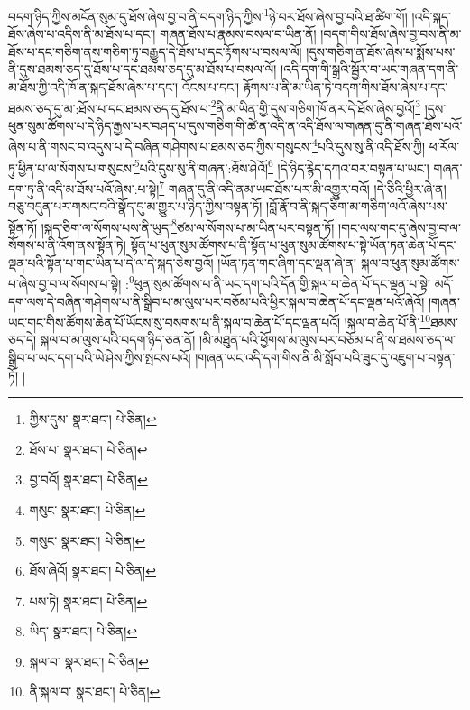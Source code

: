 བདག་ཉིད་ཀྱིས་མངོན་སུམ་དུ་ཐོས་ཞེས་བྱ་བ་ནི་བདག་ཉིད་ཀྱིས་\footnote{ཀྱིས་དུས་  སྣར་ཐང་།  པེ་ཅིན། }ཉེ་བར་ཐོས་ཞེས་བྱ་བའི་ཐ་ཚིག་གོ། །འདི་སྐད་ཐོས་ཞེས་པ་འདིས་ནི་མ་ཐོས་པ་དང་། གཞན་ཐོས་པ་རྣམས་བསལ་བ་ཡིན་ནོ། །བདག་གིས་ཐོས་ཞེས་བྱ་བས་ནི་མ་ཐོས་པ་དང་གཅིག་ནས་གཅིག་ཏུ་བརྒྱུད་དེ་ཐོས་པ་དང་རྟོགས་པ་བསལ་ལོ། །དུས་གཅིག་ན་ཐོས་ཞེས་པ་སྨོས་པས་ནི་དུས་ཐམས་ཅད་དུ་ཐོས་པ་དང་ཐམས་ཅད་དུ་མ་ཐོས་པ་བསལ་ལོ། །འདི་དག་གི་སྒྲའི་སྦྱོར་བ་ཡང་གཞན་དག་ནི་མ་ཐོས་ཀྱི་འདི་ཁོ་ན་སྐད་ཐོས་ཞེས་པ་དང་། འོངས་པ་དང་། རྟོགས་པ་ནི་མ་ཡིན་ཏེ་བདག་གིས་ཐོས་ཞེས་པ་དང་ཐམས་ཅད་དུ་མ་:ཐོས་པ་དང་ཐམས་ཅད་དུ་ཐོས་པ་\footnote{ཐོས་པ་  སྣར་ཐང་།  པེ་ཅིན། }ནི་མ་ཡིན་གྱི་དུས་གཅིག་ཁོ་ནར་དེ་ཐོས་ཞེས་བྱའོ།\footnote{བྱ་བའོ།  སྣར་ཐང་།  པེ་ཅིན། } །དུས་ཕུན་སུམ་ཚོགས་པ་དེ་ཉིད་རྒྱས་པར་བཤད་པ་དུས་གཅིག་གི་ཚེ་ན་འདི་ན་འདི་ཐོས་ལ་གཞན་དུ་ནི་གཞན་ཐོས་པའོ་ཞེས་པ་ནི་གསང་བ་འདུས་པ་དེ་བཞིན་གཤེགས་པ་ཐམས་ཅད་ཀྱིས་གསུངས་\footnote{གསུང་  སྣར་ཐང་།  པེ་ཅིན། }པའི་དུས་སུ་ནི་འདི་ཐོས་ཀྱི། ཕ་རོལ་ཏུ་ཕྱིན་པ་ལ་སོགས་པ་གསུངས་\footnote{གསུང་  སྣར་ཐང་།  པེ་ཅིན། }པའི་དུས་སུ་ནི་གཞན་:ཐོས་ཤེའོ།\footnote{ཐོས་ཞེའོ།  སྣར་ཐང་།  པེ་ཅིན། } །དེ་ཉིད་རྙེད་དཀའ་བར་བསྟན་པ་ཡང་། གཞན་དག་ཏུ་ནི་འདི་མ་ཐོས་པའོ་ཞེས་:པ་སྟེ།\footnote{པས་ཏེ།  སྣར་ཐང་།  པེ་ཅིན། } གཞན་དུ་ནི་འདི་ནམ་ཡང་ཐོས་པར་མི་འགྱུར་བའོ། །དེ་ཅིའི་ཕྱིར་ཞེ་ན། བཅུ་བདུན་པར་གསང་བའི་སྣོད་དུ་མ་གྱུར་པ་ཉིད་ཀྱིས་བསྟན་ཏོ། །བློ་རྣོ་བ་ནི་སྐད་ཅིག་མ་གཅིག་ལའོ་ཞེས་པས་སྟོན་ཏོ། །སྐད་ཅིག་ལ་སོགས་པས་ནི་ཡུད་\footnote{ཡིད་  སྣར་ཐང་།  པེ་ཅིན། }ཙམ་ལ་སོགས་པ་མ་ཡིན་པར་བསྟན་ཏོ། །གང་ལས་གང་དུ་ཞེས་བྱ་བ་ལ་སོགས་པ་ནི་འོག་ནས་སྟོན་ཏེ། སྟོན་པ་ཕུན་སུམ་ཚོགས་པ་ནི་སྟོན་པ་ཕུན་སུམ་ཚོགས་པ་སྟེ་ཡོན་ཏན་ཆེན་པོ་དང་ལྡན་པའི་སྟོན་པ་གང་ཡིན་པ་དེ་ལ་དེ་སྐད་ཅེས་བྱའོ། །ཡོན་ཏན་གང་ཞིག་དང་ལྡན་ཞེ་ན། སྐལ་བ་ཕུན་སུམ་ཚོགས་པ་ཞེས་བྱ་བ་ལ་སོགས་པ་སྟེ། :\footnote{སྐལ་བ་  སྣར་ཐང་།  པེ་ཅིན། }ཕུན་སུམ་ཚོགས་པ་ནི་ཡང་དག་པའི་དོན་གྱི་སྐལ་བ་ཆེན་པོ་དང་ལྡན་པ་སྟེ། མདོ་དག་ལས་དེ་བཞིན་གཤེགས་པ་ནི་སྒྲིབ་པ་མ་ལུས་པར་བཅོམ་པའི་ཕྱིར་སྐལ་བ་ཆེན་པོ་དང་ལྡན་པའོ་ཞེའོ། །གཞན་ཡང་གང་གིས་ཚོགས་ཆེན་པོ་ཡོངས་སུ་བསགས་པ་ནི་སྐལ་བ་ཆེན་པོ་དང་ལྡན་པའོ། །སྐལ་བ་ཆེན་པོ་ནི་\footnote{ནི་སྐལ་བ་  སྣར་ཐང་།  པེ་ཅིན། }ཐམས་ཅད་དེ། སྐལ་བ་མ་ལུས་པའི་བདག་ཉིད་ཅན་ནོ། །མི་མཐུན་པའི་ཕྱོགས་མ་ལུས་པར་བཅོམ་པ་ནི་ས་ཐམས་ཅད་ལ་སྒྲིབ་པ་ཡང་དག་པའི་ཡེ་ཤེས་ཀྱིས་སྤངས་པའོ། །གཞན་ཡང་འདི་དག་གིས་ནི་མི་སློབ་པའི་ཟུང་དུ་འཇུག་པ་བསྟན་ཏོ། །
